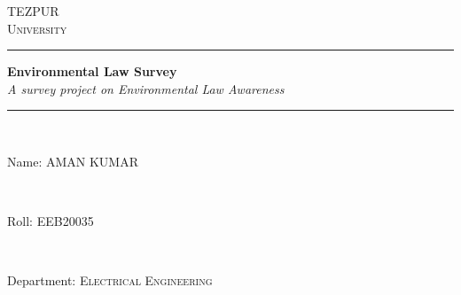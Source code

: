 \newcommand{\reporttitle}[2]{
\center
\rule[0.2cm]{13cm}{0.1cm}
{ \huge \bfseries #1}\\[0.4cm] %
{\Large \slshape #2}\\[0.4cm]
\rule[0.2cm]{13cm}{0.1cm}\\[3cm]
}

\newcommand{\UNI}{
\textsc{\Huge TEZPUR \\[0.3cm] University}\\[0.7cm]
}

\newcommand{\info}[2]{
\begin{minipage}{0.4\textwidth}
\normalsize
\centering
#1 \textsc{#2}\\
\end{minipage}\\
}

\begin{titlepage}

\center 
\UNI

\reporttitle{Environmental Law Survey}{A survey project on Environmental Law Awareness}

\info{Name: } {AMAN KUMAR}
\info{Roll: } {EEB20035}
\info{Department: } {Electrical Engineering}
\vfill

\end{titlepage}
